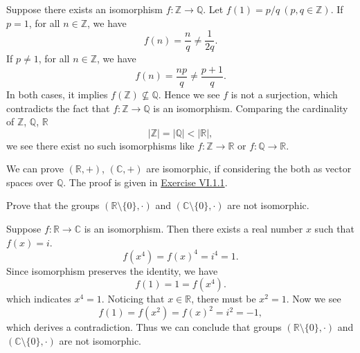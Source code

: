 \documentclass[12pt,letterpaper,boxed]{hmcpset}
\begin{document}
\begin{solution}
	Suppose there exists an isomorphism $f:\mathbb{Z}\rightarrow\mathbb{Q}$. Let $f(1)=p/q\ (p,q\in\mathbb{Z})$. If $p=1$, for all $n\in\mathbb{Z}$, we have
	\[
	f(n)=\frac{n}{q}\ne\frac{1}{2q}.
	\]
	If $p\ne1$, for all $n\in\mathbb{Z}$, we have
	\[
	f(n)=\frac{np}{q}\ne\frac{p+1}{q}.
	\]
	In both cases, it implies $f(\mathbb{Z})\nsubseteq\mathbb{Q}$.  Hence we see $f$ is not a surjection, which contradicts the fact that $f:\mathbb{Z}\rightarrow\mathbb{Q}$ is an isomorphism. Comparing the cardinality of $\mathbb{Z}$, $\mathbb{Q}$, $\mathbb{R}$
	\[
	|\mathbb{Z}|=|\mathbb{Q}|<|\mathbb{R}|,
	\] 
	we see there exist no such isomorphisms like $f:\mathbb{Z}\rightarrow \mathbb{R}$ or $f:\mathbb{Q}\rightarrow \mathbb{R}$. 
	
	\noindent We can prove $(\mathbb{R}, +)$, $(\mathbb{C}, +)$ are isomorphic, if considering the both as vector spaces over $\mathbb{Q}$. The proof is given in \hyperlink{Exercise VI.1.1}{Exercise VI.1.1}.
\end{solution}



\begin{problem}[4.5]
Prove that the groups $(\mathbb{R}\setminus\{0\},\cdot)$ and $(\mathbb{C}\setminus\{0\}, \cdot)$ are not isomorphic.
\end{problem}

\begin{solution}
	Suppose $f:\mathbb{R}\rightarrow\mathbb{C}$ is an isomorphism. Then there exists a real number $x$ such that $f(x)=i$. 
	\[
	f(x^4)=f(x)^4=i^4=1.
	\]
	Since isomorphism preserves the identity, we have
	\[
	f(1)=1=f(x^4).
	\]
	which indicates $x^4=1$. Noticing that $x\in\mathbb{R}$, there must be $x^2=1$. Now we see
	\[
	f(1)=f(x^2)=f(x)^2=i^2=-1,
	\]
	which derives a contradiction. Thus we can conclude that groups $(\mathbb{R}\setminus\{0\},\cdot)$ and $(\mathbb{C}\setminus\{0\}, \cdot)$ are not isomorphic.

\end{solution}
\end{document}
